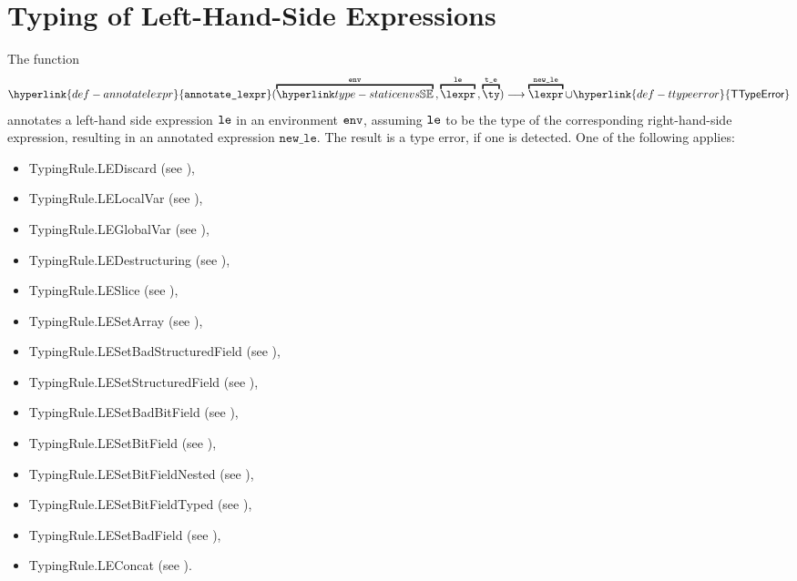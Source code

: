 \documentclass{book}
\newcommand\TTypeError[0]{\hyperlink{def-ttypeerror}{\textsf{TTypeError}}}
\newcommand\annotatelexpr[1]{\hyperlink{def-annotatelexpr}{\texttt{annotate\_lexpr}}(#1)}
\newcommand\vte[0]{\texttt{t\_e}}
\newcommand\newle[0]{\texttt{new\_le}}
\begin{document}
\chapter{Typing of Left-Hand-Side Expressions}
\hypertarget{def-annotatelexpr}{}
The function
\[
  \annotatelexpr{
    \overname{\staticenvs}{\tenv} \aslsep
    \overname{\lexpr}{\vle} \aslsep
    \overname{\ty}{\vte}} \aslto
    \overname{\lexpr}{\newle} \cup \TTypeError
\]
annotates a left-hand side expression $\texttt{le}$ in an environment $\texttt{env}$, assuming $\texttt{le}$
to be the type of the corresponding right-hand-side expression,
resulting in an annotated expression $\newle$.
The result is a type error, if one is detected.
One of the following applies:
\begin{itemize}
\item TypingRule.LEDiscard (see ),
\item TypingRule.LELocalVar (see ),
\item TypingRule.LEGlobalVar (see ),
\item TypingRule.LEDestructuring (see ),
\item TypingRule.LESlice (see ),
\item TypingRule.LESetArray (see ),
\item TypingRule.LESetBadStructuredField (see ),
\item TypingRule.LESetStructuredField (see ),
\item TypingRule.LESetBadBitField (see ),
\item TypingRule.LESetBitField (see ),
\item TypingRule.LESetBitFieldNested (see ),
\item TypingRule.LESetBitFieldTyped (see ),
\item TypingRule.LESetBadField (see ),
\item TypingRule.LEConcat (see ).
\end{itemize}
\end{document}
